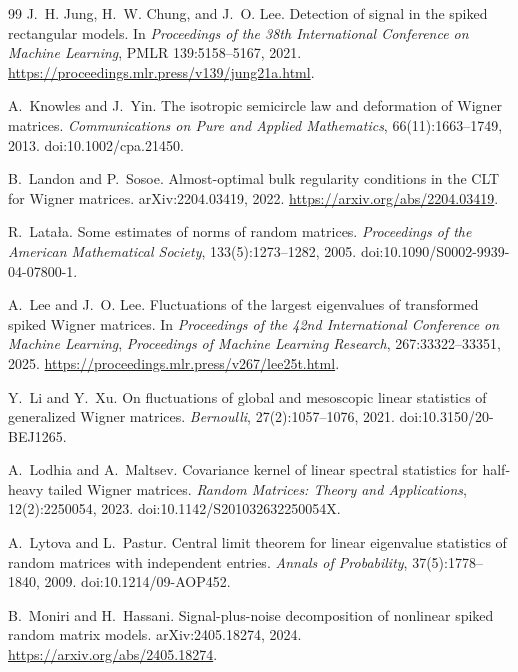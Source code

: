\documentclass[11pt]{article}
\theoremstyle{definition}
\theoremstyle{remark}
\begin{document}
\begin{thebibliography}{99}
J.~H. Jung, H.~W. Chung, and J.~O. Lee.
\newblock Detection of signal in the spiked rectangular models.
\newblock In \emph{Proceedings of the 38th International Conference on Machine Learning}, PMLR 139:5158--5167, 2021.
\newblock \url{https://proceedings.mlr.press/v139/jung21a.html}.

A.~Knowles and J.~Yin.
\newblock The isotropic semicircle law and deformation of Wigner matrices.
\newblock \emph{Communications on Pure and Applied Mathematics},
66(11):1663--1749, 2013.
\newblock doi:10.1002/cpa.21450.

B.~Landon and P.~Sosoe.
\newblock Almost-optimal bulk regularity conditions in the CLT for Wigner
matrices.
\newblock arXiv:2204.03419, 2022.
\newblock \url{https://arxiv.org/abs/2204.03419}.

R.~Lata\l a.
\newblock Some estimates of norms of random matrices.
\newblock \emph{Proceedings of the American Mathematical Society},
133(5):1273--1282, 2005.
\newblock doi:10.1090/S0002-9939-04-07800-1.

A.~Lee and J.~O. Lee.
\newblock Fluctuations of the largest eigenvalues of transformed spiked Wigner matrices.
\newblock In \emph{Proceedings of the 42nd International Conference on Machine Learning},
\emph{Proceedings of Machine Learning Research}, 267:33322--33351, 2025.
\newblock \url{https://proceedings.mlr.press/v267/lee25t.html}.

Y.~Li and Y.~Xu.
\newblock On fluctuations of global and mesoscopic linear statistics of generalized Wigner matrices.
\newblock \emph{Bernoulli}, 27(2):1057--1076, 2021.
\newblock doi:10.3150/20-BEJ1265.

A.~Lodhia and A.~Maltsev.
\newblock Covariance kernel of linear spectral statistics for half-heavy tailed Wigner matrices.
\newblock \emph{Random Matrices: Theory and Applications}, 12(2):2250054, 2023.
\newblock doi:10.1142/S201032632250054X.

A.~Lytova and L.~Pastur.
\newblock Central limit theorem for linear eigenvalue statistics of random matrices with independent entries.
\newblock \emph{Annals of Probability}, 37(5):1778--1840, 2009.
\newblock doi:10.1214/09-AOP452.

B.~Moniri and H.~Hassani.
\newblock Signal-plus-noise decomposition of nonlinear spiked random matrix models.
\newblock arXiv:2405.18274, 2024.
\newblock \url{https://arxiv.org/abs/2405.18274}.


\end{thebibliography}
\end{document}
